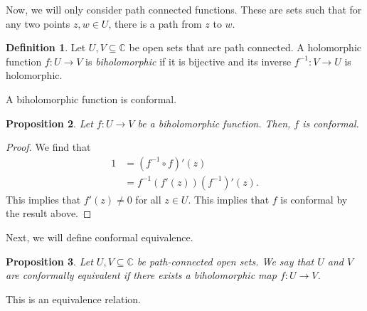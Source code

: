 \documentclass[a4paper, openany]{memoir}
\theoremstyle{definition}
\newtheorem{definition}{Definition}[section]
\theoremstyle{plain}
\newtheorem{proposition}[definition]{Proposition}
\begin{document}
Now, we will only consider path connected functions. These are sets such that for any two points $z, w \in U$, there is a path from $z$ to $w$.
\begin{definition}
    Let $U, V \subseteq \mathbb{C}$ be open sets that are path connected. A holomorphic function $f: U \to V$ is \emph{biholomorphic} if it is bijective and its inverse $f^{-1}: V \to U$ is holomorphic.
\end{definition}
A biholomorphic function is conformal.
\begin{proposition}
    Let $f: U \to V$ be a biholomorphic function. Then, $f$ is conformal.
\end{proposition}
\begin{proof}
    We find that
    \begin{align*}
        1 &= (f^{-1} \circ f)' (z) \\
        &= f^{-1} (f'(z)) (f^{-1})'(z).
    \end{align*}
    This implies that $f'(z) \neq 0$ for all $z \in U$. This implies that $f$ is conformal by the result above.
\end{proof}

Next, we will define conformal equivalence.
\begin{proposition}
    Let $U, V \subseteq \mathbb{C}$ be path-connected open sets. We say that $U$ and $V$ are \emph{conformally equivalent} if there exists a biholomorphic map $f: U \to V$.
\end{proposition}
\noindent This is an equivalence relation.
    
\end{document}
